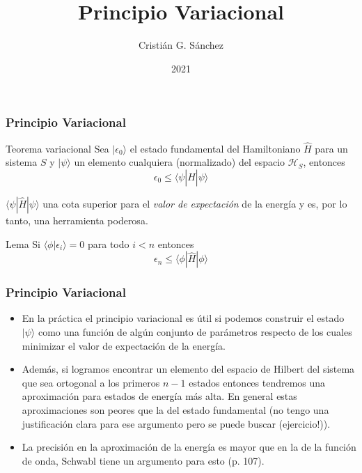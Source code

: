 \documentclass{beamer}
\title{Principio Variacional}
\author{Cristián G. Sánchez}
\date{2021}
\begin{document}
\newcommand{\bra}[1]{\langle #1 |}
\newcommand{\ket}[1]{| #1 \rangle}
\newcommand{\braket}[2]{\langle #1 | #2 \rangle}
\newcommand{\brah}[1]{(#1|}
\newcommand{\ham}{\mathcal{H}}
\newcommand{\ii}{\mathrm{i}}
\newcommand{\tr}{\mathrm{Tr}}

\frame{\titlepage}

\begin{frame}
    \frametitle{Principio Variacional}
    
    \begin{block}{Teorema variacional}
        Sea $\ket{\epsilon_0}$ el estado fundamental del Hamiltoniano $\hat{H}$ para un sistema $S$ y $\ket{\psi}$ un elemento cualquiera (normalizado) del espacio $\mathcal{H}_S$, entonces
            \[ \epsilon_0 \leq \bra{\psi}\hat{H}\ket{\psi} \]
    \end{block}

    $\bra{\psi}\hat{H}\ket{\psi}$ una cota superior para el {\em valor de expectación} de la energía y es, por lo tanto, una herramienta poderosa.

    \begin{block}{Lema}
        Si $\braket{\phi}{\epsilon_i}=0$ para todo $i<n$ entonces 
            \[ \epsilon_n \leq \bra{\phi}\hat{H}\ket{\phi} \]
    \end{block}
    
\end{frame}

\begin{frame}
    \frametitle{Principio Variacional}
    
\begin{itemize}
    \item En la práctica el principio variacional es útil si podemos construir el estado $\ket{\psi}$ como una función de algún conjunto de parámetros respecto de los cuales minimizar el valor de expectación de la energía.
    \item Además, si logramos encontrar un elemento del espacio de Hilbert del sistema que sea ortogonal a los primeros $n-1$ estados entonces tendremos una aproximación para estados de energía más alta. En general estas aproximaciones son peores que la del estado fundamental (no tengo una justificación clara para ese argumento pero se puede buscar (ejercicio!)).
    \item La precisión en la aproximación de la energía es mayor que en la de la función de onda, Schwabl tiene un argumento para esto (p. 107).
\end{itemize}
    
\end{frame}
\end{document}
